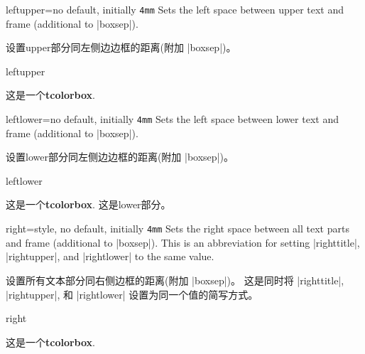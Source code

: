 \begin{docTcbKey}{leftupper}{=}{no default, initially \texttt{4mm}}
  Sets the left space between upper text and frame (additional to |boxsep|).

设置upper部分同左侧边边框的距离(附加 |boxsep|)。
\begin{exdispExample}{leftupper}

\begin{tcolorbox}[leftupper=3cm,title=My Title]
这是一个\textbf{tcolorbox}.
\end{tcolorbox}
\end{exdispExample}
\end{docTcbKey}

\begin{docTcbKey}{leftlower}{=}{no default, initially \texttt{4mm}}
  Sets the left space between lower text and frame (additional to |boxsep|).

设置lower部分同左侧边边框的距离(附加 |boxsep|)。
\begin{exdispExample}{leftlower}

\begin{tcolorbox}[leftlower=3cm]
这是一个\textbf{tcolorbox}.
\tcblower
这是lower部分。
\end{tcolorbox}
\end{exdispExample}
\end{docTcbKey}

\enlargethispage*{1cm}

\begin{docTcbKey}{right}{=}{style, no default, initially \texttt{4mm}}
  Sets the right space between all text parts and frame (additional to |boxsep|).
  This is an abbreviation for setting
  |righttitle|, |rightupper|, and |rightlower| to the same value.

设置所有文本部分同右侧边框的距离(附加 |boxsep|)。
这是同时将 |righttitle|, |rightupper|, 和 |rightlower| 设置为同一个值的简写方式。
\begin{exdispExample}{right}

\begin{tcolorbox}[width=5cm,right=2cm]
这是一个\textbf{tcolorbox}.
\end{tcolorbox}
\end{exdispExample}
\end{docTcbKey}





